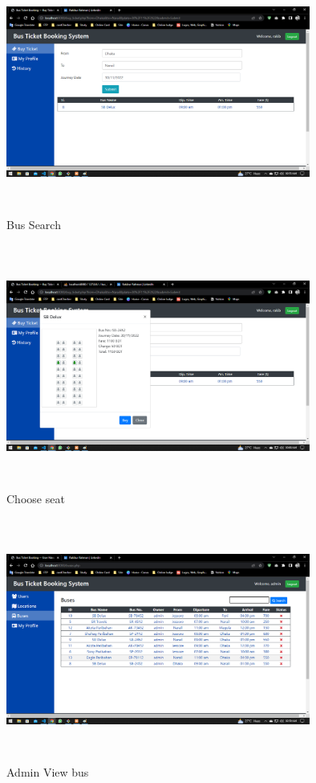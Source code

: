 \documentclass{article}
\begin{document}
\begin{figure}[h]
    \centering
    \includegraphics[width=10cm,height=8cm]{img/bussearch.png}
    \caption{Bus Search}
    \label{fig:my_label}
\end{figure}
\begin{figure}[h]
    \centering
    \includegraphics[width=10cm,height=8cm]{img/purchase ticket.png}
    \caption{Choose seat}
    \label{fig:my_label}
\end{figure}
\newpage
\begin{figure}[h]
    \centering
    \includegraphics[width=10cm,height=8cm]{img/admin view bus.png}
    \caption{Admin View bus}
    \label{fig:my_label}
\end{figure}
\end{document}
